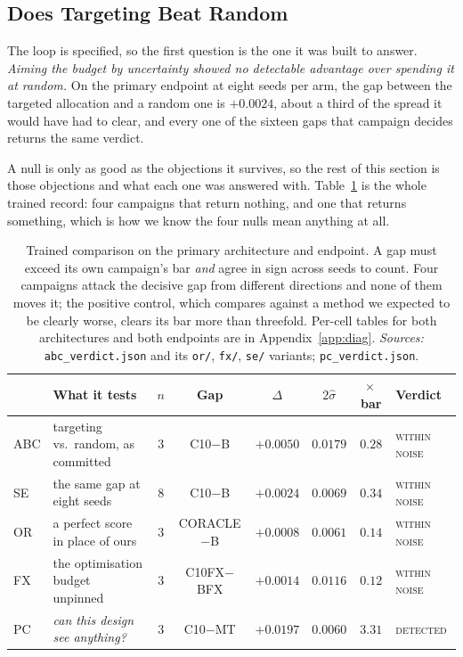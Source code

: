 \documentclass{article}
\begin{document}
\subsection{Does Targeting Beat Random}
\label{sec:null}
The loop is specified, so the first question is the one it was built to answer. \textit{Aiming the budget by uncertainty showed no detectable advantage over spending it at random.} On the primary endpoint at eight seeds
per arm, the gap between the targeted allocation and a random one is $+0.0024$, about a third of
the spread it would have had to clear, and every one of the sixteen gaps that campaign decides
returns the same verdict.

A null is only as good as the objections it survives, so the rest of this section is those
objections and what each one was answered with. Table~\ref{tab:trained} is the whole trained record: four campaigns that return nothing, and one that returns something, which is how we know the four
nulls mean anything at all.

\begin{table}[t]
\caption{Trained comparison on the primary architecture and endpoint. A gap must
exceed its own campaign's bar \emph{and} agree in sign across seeds to count. Four campaigns attack
the decisive gap from different directions and none of them moves it; the positive control, which
compares against a method we expected to be clearly worse, clears its bar more than threefold.
Per-cell tables for both architectures and both endpoints are in Appendix~\ref{app:diag}.
\emph{Sources:} \texttt{abc\_verdict.json} and its \texttt{or/}, \texttt{fx/}, \texttt{se/}
variants; \texttt{pc\_verdict.json}.}
\label{tab:trained}
\begin{center}
\small
\setlength{\tabcolsep}{4pt}
\begin{tabular}{@{}llcccccl@{}}
\toprule
& What it tests & $n$ & Gap & $\Delta$ & $2\hat{\sigma}$ & $\times$\,bar & Verdict \\
\midrule
ABC & targeting vs.\ random, as committed & $3$ & C10$-$B & $+0.0050$ & $0.0179$ & $0.28$ & \textsc{within noise} \\
SE & the same gap at eight seeds & $8$ & C10$-$B & $+0.0024$ & $0.0069$ & $0.34$ & \textsc{within noise} \\
OR & a perfect score in place of ours & $3$ & CORACLE$-$B & $+0.0008$ & $0.0061$ & $0.14$ & \textsc{within noise} \\
FX & the optimisation budget unpinned & $3$ & C10FX$-$BFX & $+0.0014$ & $0.0116$ & $0.12$ & \textsc{within noise} \\
\midrule
PC & \emph{can this design see anything?} & $3$ & C10$-$MT & $+0.0197$ & $0.0060$ & $\mathbf{3.31}$ & \textsc{detected} \\
\bottomrule
\end{tabular}
\end{center}
\end{table}
\end{document}

